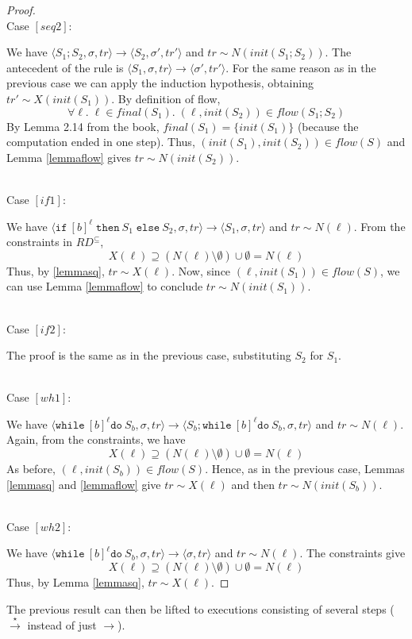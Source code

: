 \documentclass[a4wide,12pt]{article}
\theoremstyle{definition}
\theoremstyle{plain}
\theoremstyle{remark}
\def\const#1{\mathopen{\langle}#1\mathclose{\rangle}} %
\def\pair#1{\const{#1}}
\def\whilel{\texttt{while}\ }
\def\dol {\texttt{do}\ }
\def\ifl {\texttt{if}\ }
\def\thenl {\texttt{then}\ }
\def\elsel {\texttt{else}\ }
\def\starto{\overset{\star}{\to}}
\begin{document}
\begin{proof}
~\\
Case $[seq2]$:

We have $\pair{S_1;S_2,\sigma,tr} \to \pair{S_2,\sigma',tr'}$ and $tr \sim N(init(S_1;S_2))$.
The antecedent of the rule is $\pair{S_1,\sigma,tr} \to \pair{\sigma',tr'}$.
For the same reason as in the previous case we can apply the induction hypothesis, obtaining
$tr' \sim X(init(S_1))$. By definition of flow, \[\forall \ell . \; \ell \in final(S_1). \;(\ell,init(S_2)) \in flow(S_1;S_2)\]
By Lemma 2.14 from the book, $final(S_1) = \{init(S_1)\}$ (because the computation ended in one step). Thus,
$(init(S_1),init(S_2)) \in flow(S)$ and Lemma \ref{lemmaflow} gives $tr \sim N(init(S_2))$.

~\\
Case $[if1]$:

We have $\pair{\ifl [b]^\ell\; \thenl S_1\; \elsel S_2,\sigma,tr} \to \pair{S_1,\sigma,tr}$ and $tr \sim N(\ell)$.
From the constraints in $RD^{\subseteq}$, 
\[ X(\ell) \supseteq (N(\ell) \setminus \emptyset) \cup \emptyset = N(\ell)\]
Thus, by \ref{lemmasq}, $tr \sim X(\ell)$. Now, since $(\ell,init(S_1)) \in flow(S)$, we can use Lemma \ref{lemmaflow}
to conclude $tr \sim N(init(S_1))$.

~\\
Case $[if2]$:

The proof is the same as in the previous case, substituting $S_2$ for $S_1$.

~\\
Case $[wh1]$:

We have $\pair{\whilel [b]^\ell \dol S_b,\sigma,tr} \to \pair{S_b;\whilel [b]^\ell \dol S_b,\sigma,tr}$ and $tr \sim N(\ell)$.
Again, from the constraints, we have
\[X(\ell) \supseteq (N(\ell) \setminus \emptyset) \cup \emptyset = N(\ell)\]
As before, $(\ell,init(S_b)) \in flow(S)$. Hence, as in the previous case, Lemmas \ref{lemmasq} and \ref{lemmaflow} give
$tr \sim X(\ell)$ and then
$tr \sim N(init(S_b))$.

~\\
Case $[wh2]$:

We have $\pair{\whilel [b]^\ell \dol S_b,\sigma,tr} \to \pair{\sigma,tr}$ and $tr \sim N(\ell)$.
The constraints give
\[X(\ell) \supseteq (N(\ell) \setminus \emptyset) \cup \emptyset = N(\ell)\]
Thus, by Lemma \ref{lemmasq}, $tr \sim X(\ell)$.

\end{proof}


The previous result can then be lifted to executions consisting of several steps
($\starto$ instead of just $\to$).
\end{document}
